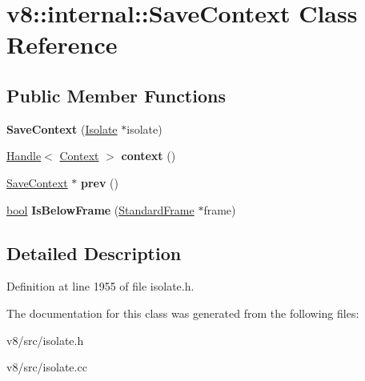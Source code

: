 \hypertarget{classv8_1_1internal_1_1SaveContext}{}\section{v8\+:\+:internal\+:\+:Save\+Context Class Reference}
\label{classv8_1_1internal_1_1SaveContext}
\subsection*{Public Member Functions}
\begin{DoxyCompactItemize}
\item 
\mbox{\label{classv8_1_1internal_1_1SaveContext_a1f36f7a80f7683c7f86e4b224f91da0a}} 
{\bfseries Save\+Context} (\mbox{\hyperlink{classv8_1_1internal_1_1Isolate}{Isolate}} $\ast$isolate)
\item 
\mbox{\label{classv8_1_1internal_1_1SaveContext_a94b6d522a3dcf051c5f9b50216b16e20}} 
\mbox{\hyperlink{classv8_1_1internal_1_1Handle}{Handle}}$<$ \mbox{\hyperlink{classv8_1_1internal_1_1Context}{Context}} $>$ {\bfseries context} ()
\item 
\mbox{\label{classv8_1_1internal_1_1SaveContext_a06bd9915afc20e4c229524fb0f5addd4}} 
\mbox{\hyperlink{classv8_1_1internal_1_1SaveContext}{Save\+Context}} $\ast$ {\bfseries prev} ()
\item 
\mbox{\label{classv8_1_1internal_1_1SaveContext_abec2b4bb34964502bcb7dd20d6b5431a}} 
\mbox{\hyperlink{classbool}{bool}} {\bfseries Is\+Below\+Frame} (\mbox{\hyperlink{classv8_1_1internal_1_1StandardFrame}{Standard\+Frame}} $\ast$frame)
\end{DoxyCompactItemize}


\subsection{Detailed Description}


Definition at line 1955 of file isolate.\+h.



The documentation for this class was generated from the following files\+:\begin{DoxyCompactItemize}
\item 
v8/src/isolate.\+h\item 
v8/src/isolate.\+cc\end{DoxyCompactItemize}
